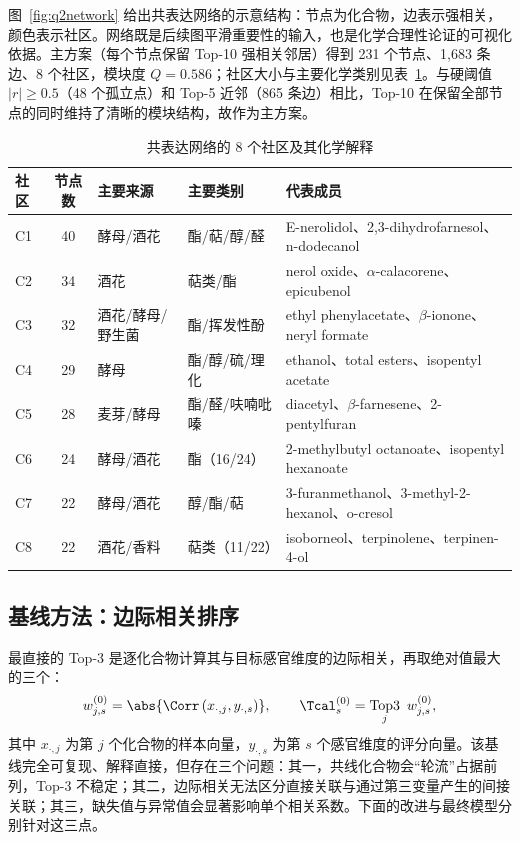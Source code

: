 
图~\ref{fig:q2network} 给出共表达网络的示意结构：节点为化合物，边表示强相关，颜色表示社区。网络既是后续图平滑重要性的输入，也是化学合理性论证的可视化依据。主方案（每个节点保留 Top-10 强相关邻居）得到 231 个节点、1,683 条边、8 个社区，模块度 $Q=0.586$；社区大小与主要化学类别见表~\ref{tab:q2-communities}。与硬阈值 $|r|\ge0.5$（48 个孤立点）和 Top-5 近邻（865 条边）相比，Top-10 在保留全部节点的同时维持了清晰的模块结构，故作为主方案。

\begin{table}[htbp]
  \centering
  \caption{共表达网络的 8 个社区及其化学解释}
  \label{tab:q2-communities}
  \small
  \begin{tabularx}{\textwidth}{@{}l c l l X@{}}
    \toprule
    社区 & 节点数 & 主要来源 & 主要类别 & 代表成员 \\
    \midrule
    C1 & 40 & 酵母/酒花 & 酯/萜/醇/醛 & E-nerolidol、2,3-dihydrofarnesol、n-dodecanol \\
    C2 & 34 & 酒花 & 萜类/酯 & nerol oxide、$\alpha$-calacorene、epicubenol \\
    C3 & 32 & 酒花/酵母/野生菌 & 酯/挥发性酚 & ethyl phenylacetate、$\beta$-ionone、neryl formate \\
    C4 & 29 & 酵母 & 酯/醇/硫/理化 & ethanol、total esters、isopentyl acetate \\
    C5 & 28 & 麦芽/酵母 & 酯/醛/呋喃吡嗪 & diacetyl、$\beta$-farnesene、2-pentylfuran \\
    C6 & 24 & 酵母/酒花 & 酯（16/24） & 2-methylbutyl octanoate、isopentyl hexanoate \\
    C7 & 22 & 酵母/酒花 & 醇/酯/萜 & 3-furanmethanol、3-methyl-2-hexanol、o-cresol \\
    C8 & 22 & 酒花/香料 & 萜类（11/22） & isoborneol、terpinolene、terpinen-4-ol \\
    \bottomrule
  \end{tabularx}
\end{table}

\subsection{基线方法：边际相关排序}

最直接的 Top-3 是逐化合物计算其与目标感官维度的边际相关，再取绝对值最大的三个：
\begin{equation}
  w_{j,s}^{(0)}=\abs{\Corr\left(x_{\cdot,j},y_{\cdot,s}\right)},
  \qquad
  \Tcal_s^{(0)}=\operatorname*{Top3}_{j}\ w_{j,s}^{(0)},
  \label{eq:q2-baseline}
\end{equation}
其中 $x_{\cdot,j}$ 为第 $j$ 个化合物的样本向量，$y_{\cdot,s}$ 为第 $s$ 个感官维度的评分向量。该基线完全可复现、解释直接，但存在三个问题：其一，共线化合物会“轮流”占据前列，Top-3 不稳定；其二，边际相关无法区分直接关联与通过第三变量产生的间接关联；其三，缺失值与异常值会显著影响单个相关系数。下面的改进与最终模型分别针对这三点。

